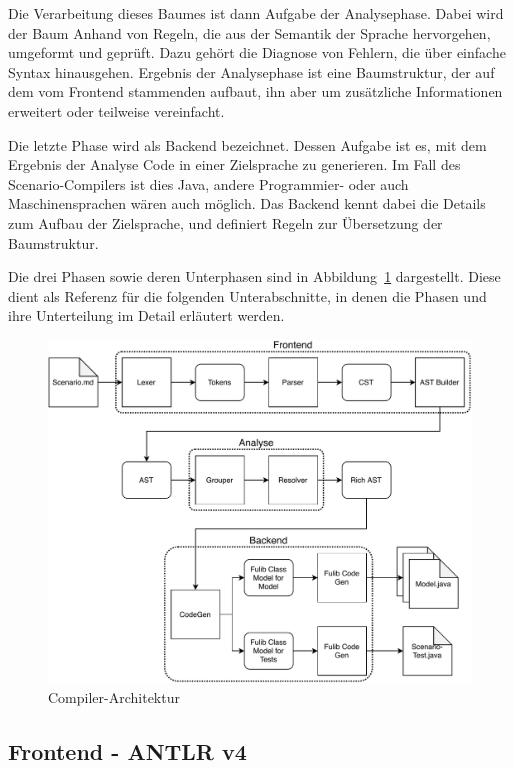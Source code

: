 Die Verarbeitung dieses Baumes ist dann Aufgabe der Analysephase.
Dabei wird der Baum Anhand von Regeln, die aus der Semantik der Sprache hervorgehen, umgeformt und geprüft.
Dazu gehört die Diagnose von Fehlern, die über einfache Syntax hinausgehen.
Ergebnis der Analysephase ist eine Baumstruktur,
der auf dem vom Frontend stammenden aufbaut, ihn aber um zusätzliche Informationen erweitert oder teilweise vereinfacht.

Die letzte Phase wird als Backend bezeichnet.
Dessen Aufgabe ist es, mit dem Ergebnis der Analyse Code in einer Zielsprache zu generieren.
Im Fall des Scenario-Compilers ist dies Java, andere Programmier- oder auch Maschinensprachen wären auch möglich.
Das Backend kennt dabei die Details zum Aufbau der Zielsprache,
und definiert Regeln zur Übersetzung der Baumstruktur.

Die drei Phasen sowie deren Unterphasen sind in Abbildung~\ref{fig:compiler-architecture} dargestellt.
Diese dient als Referenz für die folgenden Unterabschnitte,
in denen die Phasen und ihre Unterteilung im Detail erläutert werden.

\begin{figure}
    \includegraphics[width=\textwidth]{chapter/fulib-scenarios/img/architecture.pdf}
    \caption{Compiler-Architektur}
    \label{fig:compiler-architecture}
\end{figure}

\subsection{Frontend - ANTLR v4}\label{subsec:frontend-antlr4}

